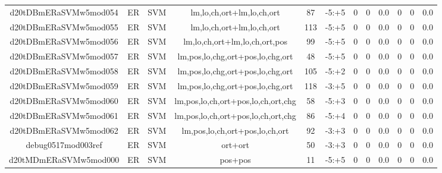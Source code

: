 \documentclass[a4paper]{article}
\begin{document}
\begin{landscape}
\begin{center}
\begin{tabular}{ |c|c|c|c|c|c|c|c|c|c|c|c|}
 	\small{ d20tDBmERaSVMw5mod054 } & ER & SVM & lm,lo,ch,ort+lm,lo,ch,ort  &  87 &  -5:+5  &  0 & 0 & 0.0  &  0 & 0 & 0.0 \\
 	

 
 	
 	\small{ d20tDBmERaSVMw5mod055 } & ER & SVM & lm,lo,ch,ort+lm,lo,ch,ort  &  113 &  -5:+5  &  0 & 0 & 0.0  &  0 & 0 & 0.0 \\
 	

 
 	
 	\small{ d20tDBmERaSVMw5mod056 } & ER & SVM & lm,lo,ch,ort+lm,lo,ch,ort,pos  &  99 &  -5:+5  &  0 & 0 & 0.0  &  0 & 0 & 0.0 \\
 	

 
 	
 	\small{ d20tDBmERaSVMw5mod057 } & ER & SVM & lm,pos,lo,chg,ort+pos,lo,chg,ort  &  48 &  -5:+5  &  0 & 0 & 0.0  &  0 & 0 & 0.0 \\
 	

 
 	
 	\small{ d20tDBmERaSVMw5mod058 } & ER & SVM & lm,pos,lo,chg,ort+pos,lo,chg,ort  &  105 &  -5:+2  &  0 & 0 & 0.0  &  0 & 0 & 0.0 \\
 	

 
 	
 	\small{ d20tDBmERaSVMw5mod059 } & ER & SVM & lm,pos,lo,chg,ort+pos,lo,chg,ort  &  118 &  -3:+5  &  0 & 0 & 0.0  &  0 & 0 & 0.0 \\
 	

 
 	
 	\small{ d20tDBmERaSVMw5mod060 } & ER & SVM & lm,pos,lo,ch,ort+pos,lo,ch,ort,chg  &  58 &  -5:+3  &  0 & 0 & 0.0  &  0 & 0 & 0.0 \\
 	

 
 	
 	\small{ d20tDBmERaSVMw5mod061 } & ER & SVM & lm,pos,lo,ch,ort+pos,lo,ch,ort,chg  &  86 &  -5:+4  &  0 & 0 & 0.0  &  0 & 0 & 0.0 \\
 	

 
 	
 	\small{ d20tDBmERaSVMw5mod062 } & ER & SVM & lm,pos,lo,ch,ort+pos,lo,ch,ort  &  92 &  -3:+3  &  0 & 0 & 0.0  &  0 & 0 & 0.0 \\
 	

 
 	
 	\small{ debug0517mod003ref } & ER & SVM & ort+ort  &  50 &  -3:+3  &  0 & 0 & 0.0  &  0 & 0 & 0.0 \\
 	

 
 	
 	\small{ d20tMDmERaSVMw5mod000 } & ER & SVM & pos+pos  &  11 &  -5:+5  &  0 & 0 & 0.0  &  0 & 0 & 0.0 \\
 	


\end{tabular}
\end{center}
\end{landscape}
\end{document}
